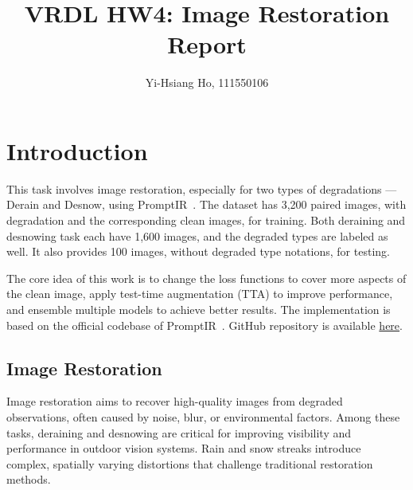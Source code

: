 \documentclass[10pt,twocolumn,letterpaper]{article}
\begin{document}
\title{VRDL HW4: Image Restoration Report}

\author{Yi-Hsiang Ho, 111550106
}
\maketitle



\section{Introduction}
\label{sec:intro}

This task involves image restoration, especially for two types of degradations ---
Derain and Desnow, using PromptIR~\cite{PromptIR}. The dataset has 3,200 paired
images, with degradation and the corresponding clean images, for training. Both
deraining and desnowing task each have 1,600 images, and the degraded types
are labeled as well. It also provides 100 images, without degraded type notations,
for testing.

The core idea of this work is to change the loss functions to cover more
aspects of the clean image, apply test-time augmentation (TTA) to improve
performance, and ensemble multiple models to achieve better results. The
implementation is based on the official codebase of PromptIR~\cite{PromptIR}.
GitHub repository is available
\href{https://github.com/Sean20405/NYCU-DLVR-HW4}{here}.

\subsection{Image Restoration}

Image restoration aims to recover high-quality images from degraded observations,
often caused by noise, blur, or environmental factors. Among these tasks,
deraining and desnowing are critical for improving visibility and performance
in outdoor vision systems. Rain and snow streaks introduce complex, spatially
varying distortions that challenge traditional restoration methods.
\end{document}
